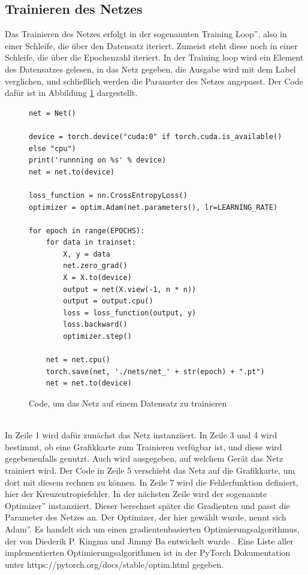 \documentclass[11pt]{article}
\begin{document}
\subsection{Trainieren des Netzes}
Das Trainieren des Netzes erfolgt in der sogenannten \glqq Training Loop'', also in einer Schleife, die über den Datensatz iteriert. Zumeist steht diese noch in einer Schleife, die über die Epochenzahl iteriert. In der Training loop wird ein Element des Datensatzes gelesen, in das Netz gegeben, die Ausgabe wird mit dem Label verglichen, und schließlich werden die Parameter des Netzes angepasst. Der Code dafür ist in Abbildung \ref{Code_train_loop} dargestellt.
 \begin{figure}[h]
 	\begin{verbatim}
net = Net()

device = torch.device("cuda:0" if torch.cuda.is_available() else "cpu")
print('runnning on %s' % device)
net = net.to(device)

loss_function = nn.CrossEntropyLoss()
optimizer = optim.Adam(net.parameters(), lr=LEARNING_RATE)

for epoch in range(EPOCHS):
	for data in trainset:
		X, y = data
		net.zero_grad() 
		X = X.to(device)
		output = net(X.view(-1, n * n))
		output = output.cpu()
		loss = loss_function(output, y)  
		loss.backward() 
		optimizer.step()  
		
	net = net.cpu()
	torch.save(net, './nets/net_' + str(epoch) + ".pt")
	net = net.to(device)

 	\end{verbatim}
 	\caption{Code, um das Netz auf einem Datensatz zu trainieren}
 	\label{Code_train_loop}
 \end{figure}
\\
In Zeile 1 wird dafür zunächst das Netz instanziiert. In Zeile 3 und 4 wird bestimmt, ob eine Grafikkarte zum Trainieren verfügbar ist, und diese wird gegebenenfalls genutzt. Auch wird ausgegeben, auf welchem Gerät das Netz trainiert wird. Der Code in Zeile 5 verschiebt das Netz auf die Grafikkarte, um dort mit diesem rechnen zu können. In Zeile 7 wird die Fehlerfunktion definiert, hier der Kreuzentropiefehler. In der nächsten Zeile wird der sogenannte \glqq Optimizer'' instanziiert. Dieser berechnet später die Gradienten und passt die Parameter des Netzes an. Der Optimizer, der hier gewählt wurde, nennt sich \glqq Adam''. Es handelt sich um einen gradientenbasierten Optimierungsalgorithmus, der von Diederik P. Kingma und Jimmy Ba entwickelt wurde \cite{7}. Eine Liste aller implementierten Optimierungsalgorithmen ist in der PyTorch Dokumentation unter https://pytorch.org/docs/stable/optim.html gegeben.\\
\end{document}
